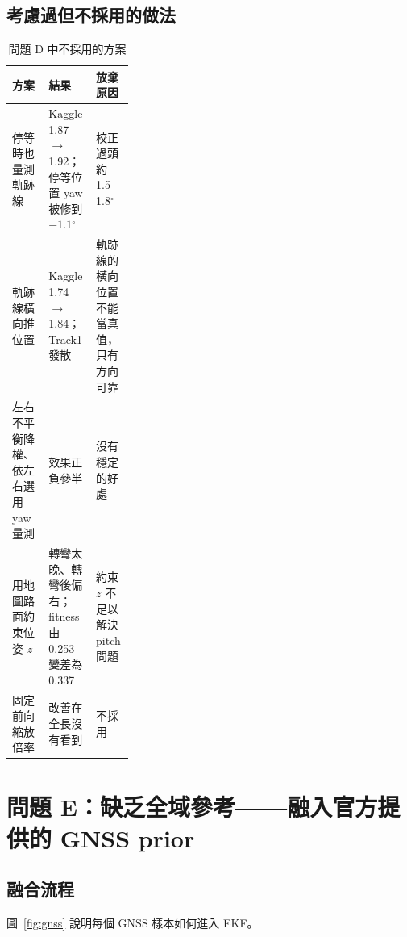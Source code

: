 \documentclass[11pt, a4paper]{article}
\newcommand{\dg}{$^{\circ}$}
\begin{document}
\subsection{考慮過但不採用的做法}
\begin{table}[H]
\centering\small
\caption{問題 D 中不採用的方案}\label{tab:D-fail}
\begin{tabularx}{\linewidth}{@{}>{\raggedright\arraybackslash}p{0.3\linewidth}YY@{}}
\toprule
方案 & 結果 & 放棄原因\\
\midrule
停等時也量測軌跡線 & Kaggle 1.87 $\to$ 1.92；停等位置 yaw 被修到 $-1.1$\dg
  & 校正過頭約 1.5--1.8\dg\\
軌跡線橫向推位置 & Kaggle 1.74 $\to$ 1.84；Track1 發散
  & 軌跡線的橫向位置不能當真值，只有方向可靠\\
左右不平衡降權、依左右選用 yaw 量測 & 效果正負參半 & 沒有穩定的好處\\
用地圖路面約束位姿 $z$ & 轉彎太晚、轉彎後偏右；fitness 由 0.253 變差為 0.337 & 約束 $z$ 不足以解決 pitch 問題\\
固定前向縮放倍率 & 改善在全長沒有看到 & 不採用\\
\bottomrule
\end{tabularx}
\end{table}

\section{問題 E：缺乏全域參考——融入官方提供的 GNSS prior}\label{sec:E}

\subsection{融合流程}
圖~\ref{fig:gnss} 說明每個 GNSS 樣本如何進入 EKF。
\end{document}
